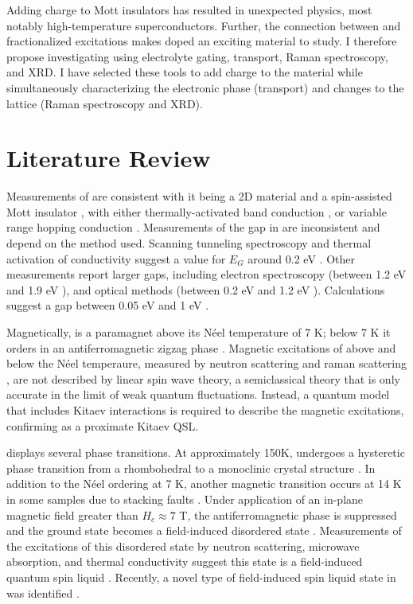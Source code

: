 \documentclass[11pt]{article}
\begin{document}
Adding charge to Mott insulators has resulted in unexpected physics, most notably high-temperature superconductors. Further, the connection between \rucl and fractionalized excitations makes doped \rucl an exciting material to study. I therefore propose investigating \rucl using electrolyte gating, transport, Raman spectroscopy, and XRD. I have selected these tools to add charge to the material while simultaneously characterizing the electronic phase (transport) and changes to the lattice (Raman spectroscopy and XRD).

\section{Literature Review}
Measurements of \rucl are consistent with it being a 2D material \cite{Kim2015a} and a spin-assisted Mott insulator \cite{Plumb2014}, with either thermally-activated band conduction \cite{Rojas1983}, or variable range hopping conduction \cite{Mashhadi2018}. Measurements of the gap in \rucl are inconsistent and depend on the method used. Scanning tunneling spectroscopy and thermal activation of conductivity suggest a value for $E_{G}$ around 0.2 eV \cite{Binotto1971,Rojas1983,Ziatdinov2016}. Other measurements report larger gaps, including electron spectroscopy (between 1.2 eV and 1.9 eV \cite{Koitzsch2016,Zhou2016,Sinn2016}), and optical methods (between 0.2 eV and 1.2 eV \cite{Reschke2017,Pollini1996,Sandilands2016}). Calculations suggest a gap between 0.05 eV and 1 eV  \cite{Sarikurt2017,Kim2015}.

Magnetically, \rucl is a paramagnet above its N{\'e}el temperature of 7 K; below 7 K it orders in an antiferromagnetic zigzag phase \cite{Sears2015}. Magnetic excitations of \rucl above and below the N{\'e}el temperaure, measured by neutron scattering and raman scattering \cite{Banerjee2016,Sandilands2015}, are not described by linear spin wave theory, a semiclassical theory that is only accurate in the limit of weak quantum fluctuations.  Instead, a quantum model that includes Kitaev interactions is required to describe the magnetic excitations, confirming \rucl as a proximate Kitaev QSL.

\rucl displays several phase transitions. At approximately 150K, \rucl  undergoes a hysteretic phase transition from a rhombohedral to a monoclinic crystal structure \cite{Kubota2015,Ziatdinov2016,Glamazda2017,Reschke2017}. In addition to the N{\'e}el ordering at 7 K, another magnetic transition occurs at 14 K in some samples due to stacking faults \cite{Banerjee2016}. Under application of an in-plane magnetic field greater than $H_{c} \approx 7$ T, the antiferromagnetic phase is suppressed and the ground state becomes a field-induced disordered state \cite{Hentrich2017,Wolter2017,Banerjee2017,Wang2017,Baek2017}. Measurements of the excitations of this disordered state by neutron scattering, microwave absorption, and thermal conductivity suggest this state is a field-induced quantum spin liquid \cite{Banerjee2016,Wellm2017,Kasahara2018}. Recently, a novel type of field-induced spin liquid state in \rucl was identified \cite{Lampen-Kelley2018}.
\end{document}
